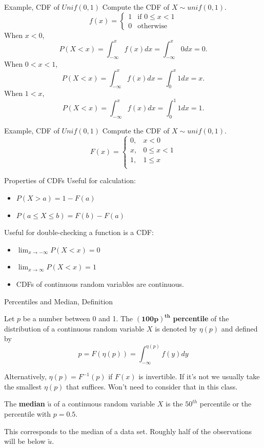 \documentclass[handout]{beamer}
\newcommand{\nl}[1]{\vspace{#1 em}}
\begin{document}
\begin{frame}{Example, CDF of $Unif(0,1)$}
    Compute the CDF of $X \sim unif(0,1)$.
    \\ \nl{0.5}
    \pause $$f(x)=\begin{cases} 1 & \text{if }0\leq x <1 \\
            0 & \text{otherwise}\end{cases} $$
    \pause
    When $x<0$,
    \pause $$P(X<x) = \int_{-\infty}^x f(x) dx = \int_{-\infty}^x 0 dx =0.$$
    When $0<x<1$,
    \pause $$P(X<x) = \int_{-\infty}^x f(x) dx = \int_{0}^x 1 dx =x.$$
    When $1<x$,
    \pause $$P(X<x) = \int_{-\infty}^x f(x) dx = \int_{0}^1 1 dx =1.$$
\end{frame}
\begin{frame}{Example, CDF of $Unif(0,1)$}
    Compute the CDF of $X \sim unif(0,1)$.
    \vfill
    $$F(x)=\begin{cases} 0, & x <0       \\
            x, & 0\leq x <1 \\
            1, & 1\leq x    \\
        \end{cases}$$
    \vfill
\end{frame}
\begin{frame}{Properties of CDFs}
    Useful for calculation:
    \begin{itemize}
        \item $P(X>a)=1-F(a)$
        \item $P(a\leq X \leq b)=F(b)-F(a)$
    \end{itemize}
    Useful for double-checking a function is a CDF:
    \begin{itemize}
        \item $\lim_{x\to -\infty}P(X<x) =0$
        \item $\lim_{x\to \infty}P(X<x) =1$
        \item CDFs of continuous random variables are continuous.
    \end{itemize}
\end{frame}
\begin{frame}{Percentiles and Median, Definition}
    \begin{block}{}
        Let $p$ be a number between 0 and 1. The $\mathbf{(100p)^{th}}$ \textbf{ percentile} of the distribution of a continuous random variable $X$ is denoted by $\eta(p)$ and defined by
        $$ p = F(\eta(p))= \int_{-\infty}^{\eta(p)} f(y)dy$$
    \end{block}
    Alternatively, $\eta(p) = F^{-1}(p)$ if $F(x)$ is invertible. If it's not we usually take the smallest $\eta(p)$ that suffices. Won't need to consider that in this class.
    \begin{block}{}
        The \textbf{median} $\tilde{u}$ of a continuous random variable $X$ is the $50^{th}$ percentile or the percentile with $p=0.5$.
    \end{block}
    This corresponds to the median of a data set. Roughly half of the observations will be below $\tilde{u}$.
\end{frame}
\end{document}
